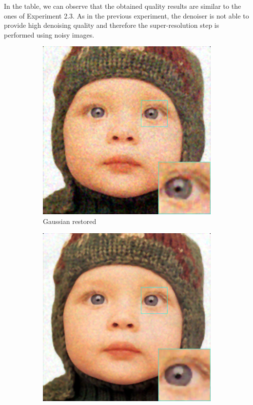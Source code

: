 In the table, we can observe that the obtained quality results are similar to the ones of Experiment 2.3. As in the previous experiment, the denoiser is not able to provide high denoising quality and therefore the super-resolution step is performed using noisy images.



\begin{figure}
	\centering
	\begin{subfigure}{0.24\textwidth}
		\includegraphics[width=\textwidth]{images/exp3.2/gaussian.png}
		\caption{Gaussian restored}
	\end{subfigure}
	\begin{subfigure}{0.24\textwidth}
		\includegraphics[width=\textwidth]{images/exp3.2/poisson.png}

\end{subfigure}
\end{figure}
